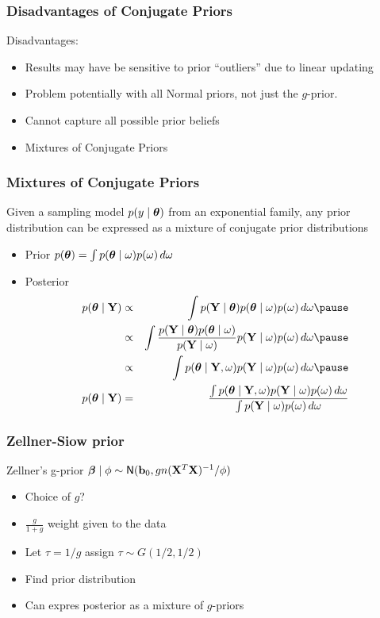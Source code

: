 \documentclass[]{beamer}
\begin{document}
\begin{frame}
  \frametitle{Disadvantages of Conjugate Priors}
  Disadvantages: \pause
\begin{itemize}
\item Results  may have be sensitive to prior ``outliers'' due to
  linear updating \pause
\item Problem potentially with all Normal priors, not just the
  $g$-prior. \pause
\item Cannot capture all possible prior beliefs \pause
\item Mixtures of Conjugate Priors
\end{itemize}
\end{frame}
\begin{frame}
  \frametitle{Mixtures of Conjugate Priors}
  \begin{theorem}  Given a sampling model
  $p(y \mid \boldsymbol{\theta})$ from an exponential family, any prior distribution
  can be expressed as a mixture of conjugate prior distributions 
 \end{theorem}

 \begin{itemize}
 \item Prior $p(\boldsymbol{\theta}) = \int p(\boldsymbol{\theta} \mid \omega) p(\omega)\, d \omega$ \pause
 \item Posterior \pause
   \begin{eqnarray*}
   p(\t \mid \Y)  &\propto & \int p(\Y \mid \t) p(\t \mid \omega)
   p(\omega) \, d\omega \pause \\
 & \propto & \int  \frac{  p(\Y \mid \t) p(\t \mid \omega) } {p(\Y \mid
   \omega)}  p(\Y \mid
 \omega) p(\omega ) \, d \omega  \pause \\
& \propto & \int p(\t \mid \Y, \omega)  p(\Y \mid
 \omega) p(\omega ) \, d \omega \pause \\
 p(\t \mid \Y) & =  & \frac{\int p(\t \mid \Y, \omega)  p(\Y \mid
 \omega) p(\omega ) \, d \omega }
{\int p(\Y \mid
 \omega) p(\omega ) \, d \omega }
       \end{eqnarray*}

 \end{itemize}
\end{frame}

\begin{frame}
  \frametitle{Zellner-Siow prior}
Zellner's g-prior $\boldsymbol{\beta} \mid \phi \sim \textsf{N}(\mathbf{b}_0, g n 
    (\mathbf{X}^T\mathbf{X})^{-1}/\phi)$ \pause

\begin{itemize}
\item Choice of $g$?  \pause
\item $\frac{g}{1 + g}$  weight given to the data \pause
\item Let $\tau = 1/g$ assign $\tau \sim G(1/2, 1/2)$
\item Find prior distribution
\item Can expres posterior as a mixture of $g$-priors
\end{itemize}
\end{frame}
\end{document}
